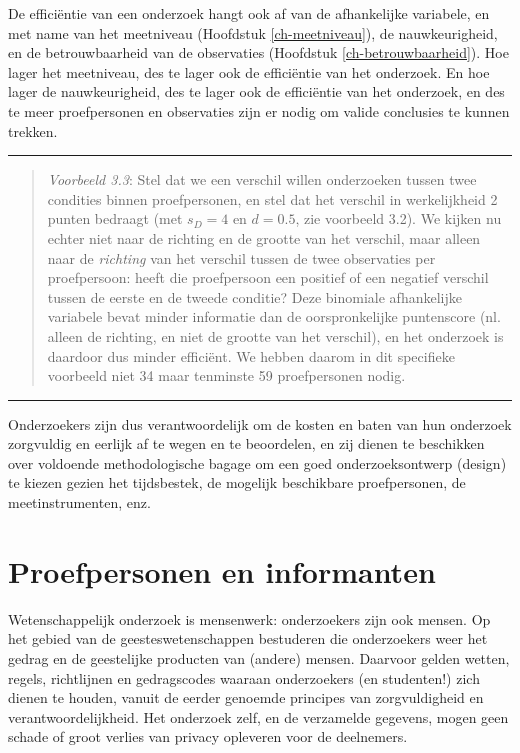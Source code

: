 \documentclass[
]{book}
\begin{document}
De efficiëntie van een onderzoek hangt ook af van de afhankelijke
variabele, en met name van het meetniveau
(Hoofdstuk \ref{ch-meetniveau}), de nauwkeurigheid, en de betrouwbaarheid
van de observaties
(Hoofdstuk \ref{ch-betrouwbaarheid}). Hoe lager het meetniveau, des te lager
ook de efficiëntie van het onderzoek. En hoe lager de nauwkeurigheid,
des te lager ook de efficiëntie van het onderzoek, en des te meer
proefpersonen en observaties zijn er nodig om valide conclusies te
kunnen trekken.

\begin{center}\rule{0.5\linewidth}{0.5pt}\end{center}

\begin{quote}
\emph{Voorbeeld 3.3}:
Stel dat we een verschil willen onderzoeken tussen twee condities binnen
proefpersonen, en stel dat het verschil in werkelijkheid 2 punten
bedraagt (met \(s_D=4\) en \(d=0.5\), zie
voorbeeld 3.2). We kijken nu echter niet naar de richting en
de grootte van het verschil, maar alleen naar de \emph{richting} van het
verschil tussen de twee observaties per proefpersoon: heeft die
proefpersoon een positief of een negatief verschil tussen de eerste en
de tweede conditie? Deze binomiale afhankelijke variabele bevat minder
informatie dan de oorspronkelijke puntenscore (nl. alleen de richting,
en niet de grootte van het verschil), en het onderzoek is daardoor dus
minder efficiënt. We hebben daarom in dit specifieke voorbeeld niet 34
maar tenminste 59 proefpersonen nodig.
\end{quote}

\begin{center}\rule{0.5\linewidth}{0.5pt}\end{center}

Onderzoekers zijn dus verantwoordelijk om de kosten en baten van hun
onderzoek zorgvuldig en eerlijk af te wegen en te beoordelen, en zij
dienen te beschikken over voldoende methodologische bagage om een goed
onderzoeksontwerp (design) te kiezen gezien het tijdsbestek, de mogelijk
beschikbare proefpersonen, de meetinstrumenten, enz.

\section{Proefpersonen en informanten}\label{proefpersonen-en-informanten}

Wetenschappelijk onderzoek is mensenwerk: onderzoekers zijn ook mensen.
Op het gebied van de geesteswetenschappen bestuderen die onderzoekers
weer het gedrag en de geestelijke producten van (andere) mensen.
Daarvoor gelden wetten, regels, richtlijnen en gedragscodes waaraan
onderzoekers (en studenten!) zich dienen te houden, vanuit de eerder
genoemde principes van zorgvuldigheid en verantwoordelijkheid. Het
onderzoek zelf, en de verzamelde gegevens, mogen geen schade of groot
verlies van privacy opleveren voor de deelnemers.
\end{document}
